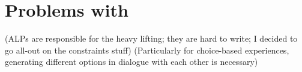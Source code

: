 \chapter{Problems with }
(ALPs are responsible for the heavy lifting; they are hard to write; I decided to go all-out on the constraints stuff)
(Particularly for choice-based experiences, generating different options in dialogue with each other is necessary)

